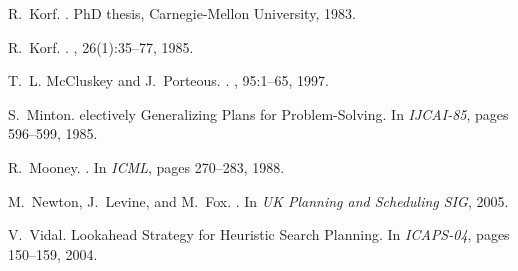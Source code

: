 \documentclass{article}
\begin{document}
\begin{thebibliography}{}
R.~Korf.
.
\newblock PhD thesis, Carnegie-Mellon University, 1983.

R.~Korf.
.
, 26(1):35--77, 1985.

T.~L. McCluskey and J.~Porteous.
.
, 95:{1--65}, 1997.

S.~Minton.
electively {G}eneralizing {P}lans for {P}roblem-{S}olving.
\newblock In {\em IJCAI-85}, pages 596--599, 1985.

R.~Mooney.
.
\newblock In {\em ICML}, pages 270--283, 1988.

M.~Newton, J.~Levine, and M.~Fox.
.
\newblock In {\em UK Planning and Scheduling SIG}, 2005.

V.~Vidal.
 {L}ookahead {S}trategy for {H}euristic {S}earch {P}lanning.
\newblock In {\em ICAPS-04}, pages 150--159, 2004.

\end{thebibliography}

% 
% 
\end{document}
